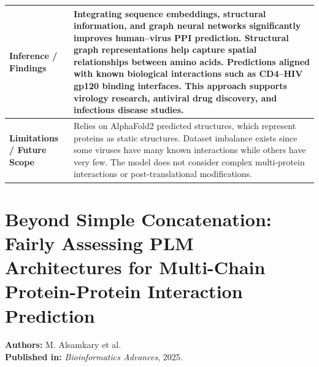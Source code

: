 \documentclass[12pt,a4paper]{report}
\begin{document}
\begin{table}[H]
\centering
\renewcommand{\arraystretch}{1.5}
\begin{tabular}{|p{}|p{}|}
\hline
\textbf{Inference / Findings} & Integrating sequence embeddings, structural information, and graph neural networks significantly improves human–virus PPI prediction. Structural graph representations help capture spatial relationships between amino acids. Predictions aligned with known biological interactions such as CD4–HIV gp120 binding interfaces. This approach supports virology research, antiviral drug discovery, and infectious disease studies. \\ \hline
\textbf{Limitations / Future Scope} & Relies on AlphaFold2 predicted structures, which represent proteins as static structures. Dataset imbalance exists since some viruses have many known interactions while others have very few. The model does not consider complex multi-protein interactions or post-translational modifications. \\ \hline
\end{tabular}
\end{table}

\newpage

\section{Beyond Simple Concatenation: Fairly Assessing PLM Architectures for Multi-Chain Protein-Protein Interaction Prediction}
\textbf{Authors:} M. Alsamkary et al. \\
\textbf{Published in:} \textit{Bioinformatics Advances}, 2025.
\end{document}
